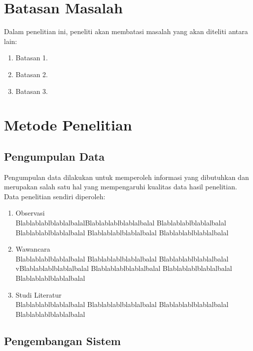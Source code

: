 \section{Batasan Masalah}
Dalam penelitian ini, peneliti akan membatasi masalah yang akan diteliti antara lain:
\begin{enumerate}[nolistsep,leftmargin=0.5cm]
\item Batasan 1.
\item Batasan 2.
\item Batasan 3.
\end{enumerate}


\section{Metode Penelitian}

\subsection{Pengumpulan Data}
Pengumpulan data dilakukan untuk memperoleh informasi yang
dibutuhkan dan merupakan salah satu hal yang mempengaruhi kualitas data hasil penelitian. Data penelitian sendiri diperoleh:
\begin{enumerate}[nolistsep,leftmargin=0.5cm]
\item Observasi \\
BlablablablblablalbalalBlablablablblablalbalal Blablablablblablalbalal Blablablablblablalbalal Blablablablblablalbalal Blablablablblablalbalal
\item Wawancara \\
Blablablablblablalbalal Blablablablblablalbalal Blablablablblablalbalal vBlablablablblablalbalal Blablablablblablalbalal Blablablablblablalbalal Blablablablblablalbalal
\item Studi Literatur \\
Blablablablblablalbalal Blablablablblablalbalal Blablablablblablalbalal Blablablablblablalbalal
\end{enumerate}

\subsection{Pengembangan Sistem}

